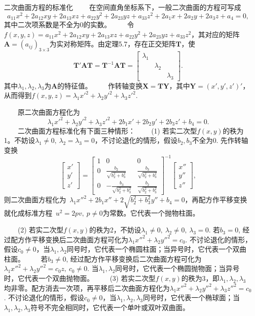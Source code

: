 \documentclass[compress,mathserif,cjk]{beamer}
\theoremstyle{remark}
\numberwithin{equation}{section}
\begin{document}
\begin{CJK}{UTF8}{gbsn}
\begin{frame}{二次曲面方程的标准化}
\ \ \ \ 在空间直角坐标系下，一般二次曲面的方程可写成
$$a_{11}x^2+2a_{12}xy+2a_{13}xz+a_{22}y^2+2a_{23}yz+a_{33}z^2+2a_1x+2a_2y+2a_3z+a_4=0,$$
其中二次项系数是不全为0的实数。
\vskip 5pt
\ \ \ \ 令$f(x,y,z)=a_{11}x^2+2a_{12}xy+2a_{13}xz+a_{22}y^2+2a_{23}yz+a_{33}z^2$，其对应的矩阵$\bm A=(a_{ij})_{3\times3}$为实对称矩阵。由定理5.7，存在正交矩阵$\bm T$，使
$$\bm T'\bm{AT}=\bm T^{-1}\bm{AT}=\left[\begin{matrix}\lambda_1&&\\&\lambda_2&\\&&\lambda_3\end{matrix}\right].$$
其中$\lambda_1,\lambda_2,\lambda_3$为$\bm A$的特征值。
\vskip 5pt
\ \ \ \ 作转轴变换$\bm X=\bm{TY}$，其中$\bm Y=(x',y',z')'$，从而得到$f(x,y,z)=\lambda_1x'^2+\lambda_2y'^2+\lambda_3z'^2$.
\end{frame}
\begin{frame}
\ \ \ \ 原二次曲面方程化为
$$\lambda_1x'^2+\lambda_2y'^2+\lambda_3z'^2+2b_1x'+2b_2y'+2b_3z'+b_4=0.$$
\ \ \ \ 二次曲面方程标准化有下面三种情形：
\vskip 5pt
\ \ \ \ (1) 若实二次型$f(x,y)$的秩为1。不妨设$\lambda_1\neq0,~\lambda_2=\lambda_3=0$，不讨论退化的情形，假设$b_2,b_3$不全为0. 先作转轴变换
$$\left[\begin{matrix}x'\\y'\\z'\end{matrix}\right]=\left[\begin{matrix}1&0&0\\0&\frac{b_2}{\sqrt{b_2^2+b_3^2}}&\frac{b_3}{\sqrt{b_2^2+b_3^2}}
\\0&-\frac{b_3}{\sqrt{b_2^2+b_3^2}}&\frac{b_2}{\sqrt{b_2^2+b_3^2}}\end{matrix}\right]^{-1}\left[\begin{matrix}x''\\y''\\z''\end{matrix}\right],$$
则二次曲面方程化为~$\lambda_1x''^2+2b_1x''+2\sqrt{b_2^2+b_3^2}y''+b_4=0$，再配方作平移变换就化成标准方程~$u^2=2pv,~p\neq0$为常数。它代表一个抛物柱面。
\end{frame}
\begin{frame}
\ \ \ \ (2) 若实二次型$f(x,y)$的秩为2，不妨设$\lambda_1\neq0,~\lambda_2\neq0,~\lambda_3=0$. 若$b_3=0$, 经过配方作平移变换后二次曲面方程可化为$\lambda_1x''^2+\lambda_2y''^2=c_0$. 不讨论退化的情形，假设$c_0\neq0$，当$\lambda_1,\lambda_2$同号时，它代表一个椭圆柱面；当异号时，它代表一个双曲柱面。
\pause\vskip 5pt
\ \ \ \ 若$b_3\neq0$, 经过配方作平移变换后二次曲面方程可化为$\lambda_1x''^2+\lambda_2y''^2=c_0z,~c_0\neq0$. 当$\lambda_1,\lambda_2$同号时，它代表一个椭圆抛物面；当异号时，它代表一个双曲抛物面。
\pause\vskip 5pt
\ \ \ \ (3) 若实二次型$f(x,y)$的秩为3，即$\lambda_1,\lambda_2,\lambda_3$均非零。配方消去一次项，再平移后二次曲面方程化为$\lambda_1x''^2+\lambda_2y''^2+\lambda_3z''^2=c_0$. 不讨论退化的情形，假设$c_0\neq0$，当$\lambda_1,\lambda_2,\lambda_3$同号时，它代表一个椭球面；当$\lambda_1,\lambda_2,\lambda_3$符号不完全相同时，它代表一个单叶或双叶双曲面。
\end{frame}


\end{CJK}
\end{document}
